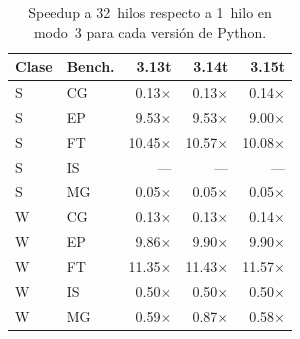 \begin{table}[htbp]
\centering
\small
\begin{tabular}{llrrr}
\hline
Clase & Bench. & 3.13t & 3.14t & 3.15t \\
\hline
S & CG & 0.13$\times$ & 0.13$\times$ & 0.14$\times$ \\
S & EP & 9.53$\times$ & 9.53$\times$ & 9.00$\times$ \\
S & FT & 10.45$\times$ & 10.57$\times$ & 10.08$\times$ \\
S & IS & --- & --- & --- \\
S & MG & 0.05$\times$ & 0.05$\times$ & 0.05$\times$ \\
W & CG & 0.13$\times$ & 0.13$\times$ & 0.14$\times$ \\
W & EP & 9.86$\times$ & 9.90$\times$ & 9.90$\times$ \\
W & FT & 11.35$\times$ & 11.43$\times$ & 11.57$\times$ \\
W & IS & 0.50$\times$ & 0.50$\times$ & 0.50$\times$ \\
W & MG & 0.59$\times$ & 0.87$\times$ & 0.58$\times$ \\
\hline
\end{tabular}
\caption{Speedup a 32~hilos respecto a 1~hilo en modo~3 para cada versión de Python.}
\label{tab:versiones-speedup32-mode3}
\end{table}
